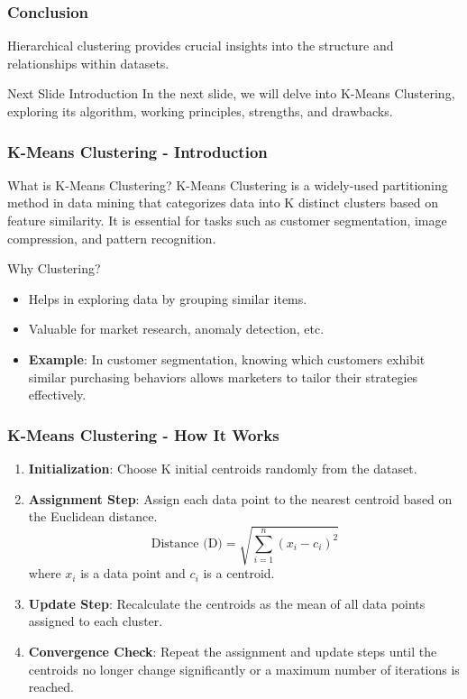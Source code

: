 \documentclass[aspectratio=169]{beamer}
\begin{document}
\begin{frame}[fragile]
    \frametitle{Conclusion}
    Hierarchical clustering provides crucial insights into the structure and relationships within datasets.
    
    \begin{block}{Next Slide Introduction}
        In the next slide, we will delve into K-Means Clustering, exploring its algorithm, working principles, strengths, and drawbacks.
    \end{block}
\end{frame}

\begin{frame}[fragile]
    \frametitle{K-Means Clustering - Introduction}
    \begin{block}{What is K-Means Clustering?}
        K-Means Clustering is a widely-used partitioning method in data mining that categorizes data into K distinct clusters based on feature similarity. It is essential for tasks such as customer segmentation, image compression, and pattern recognition.
    \end{block}
    
    \begin{block}{Why Clustering?}
        \begin{itemize}
            \item Helps in exploring data by grouping similar items.
            \item Valuable for market research, anomaly detection, etc.
            \item \textbf{Example}: In customer segmentation, knowing which customers exhibit similar purchasing behaviors allows marketers to tailor their strategies effectively.
        \end{itemize}
    \end{block}
\end{frame}

\begin{frame}[fragile]
    \frametitle{K-Means Clustering - How It Works}
    \begin{enumerate}
        \item \textbf{Initialization}: Choose K initial centroids randomly from the dataset.
        \item \textbf{Assignment Step}: Assign each data point to the nearest centroid based on the Euclidean distance.
        \begin{equation}
            \text{Distance (D)} = \sqrt{\sum_{i=1}^{n} (x_i - c_i)^2}
        \end{equation}
        where \(x_i\) is a data point and \(c_i\) is a centroid.
        \item \textbf{Update Step}: Recalculate the centroids as the mean of all data points assigned to each cluster.
        \item \textbf{Convergence Check}: Repeat the assignment and update steps until the centroids no longer change significantly or a maximum number of iterations is reached.
    \end{enumerate}
\end{frame}
\end{document}

